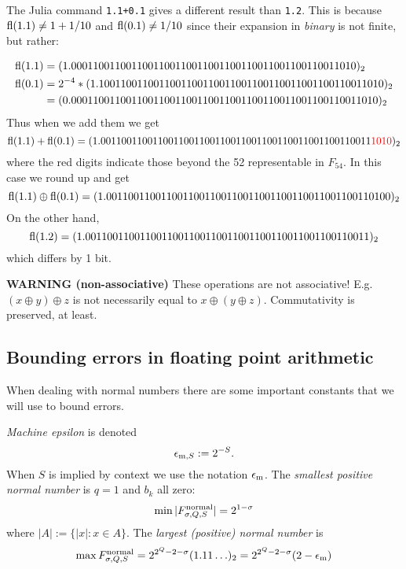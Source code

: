 \begin{example} The Julia command \texttt{1.1+0.1} gives a different result than \texttt{1.2}. This is because ${\rm fl}(1.1) \ensuremath{\neq} 1+1/10$ and ${\rm fl}(0.1) \ensuremath{\neq} 1/10$ since their expansion in \emph{binary} is not finite, but rather:


\begin{align*}
{\rm fl}(1.1) &= (1.0001100110011001100110011001100110011001100110011010)_2 \\
{\rm fl}(0.1) &= 2^{-4} * (1.1001100110011001100110011001100110011001100110011010)_2 \\
              &= (0.00011001100110011001100110011001100110011001100110011010)_2
\end{align*}
Thus when we add them we get
\[
{\rm fl}(1.1) + {\rm fl}(0.1) = (1.0011001100110011001100110011001100110011001100110011{\color{red} 1010})_2
\]
where the red digits indicate those beyond the 52 representable in $F_{54}$. In this case we round up and get
\[
{\rm fl}(1.1) \ensuremath{\oplus} {\rm fl}(0.1) = (1.0011001100110011001100110011001100110011001100110100)_2
\]
On the other hand,
\[
{\rm fl}(1.2) = (1.0011001100110011001100110011001100110011001100110011)_2
\]
which differs by 1 bit. \end{example}

\textbf{WARNING (non-associative)} These operations are not associative! E.g. $(x \ensuremath{\oplus} y) \ensuremath{\oplus} z$ is not necessarily equal to $x \ensuremath{\oplus} (y \ensuremath{\oplus} z)$. Commutativity is preserved, at least.

\subsection{Bounding errors in floating point arithmetic}
When dealing with normal numbers there are some important constants that we will use to bound errors.

\begin{definition} \emph{Machine epsilon} is denoted
\[
\ensuremath{\epsilon}_{{\rm m},S} := 2^{-S}.
\]
When $S$ is implied by context we use the notation $\ensuremath{\epsilon}_{\rm m}$. The \emph{smallest positive normal number} is $q = 1$ and $b_k$ all zero:
\[
\min |F_{\ensuremath{\sigma},Q,S}^{\rm normal}| = 2^{1-\ensuremath{\sigma}}
\]
where $|A| := \{|x| : x \in A \}$. The \emph{largest (positive) normal number} is
\[
\max F_{\ensuremath{\sigma},Q,S}^{\rm normal} = 2^{2^Q-2-\ensuremath{\sigma}} (1.11\ensuremath{\ldots})_2 = 2^{2^Q-2-\ensuremath{\sigma}} (2-\ensuremath{\epsilon}_{\rm m})
\]
\end{definition}

